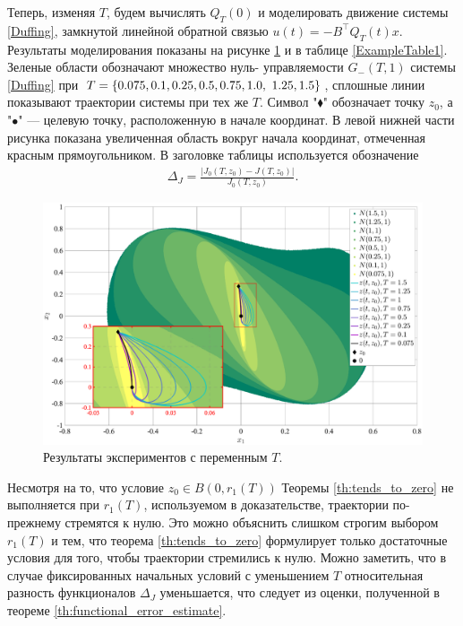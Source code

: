 \documentclass[../main.tex]{subfiles}
\begin{document}
Теперь, изменяя $T$, будем вычислять $Q_T(0)$ и моделировать движение системы \eqref{Duffing}, замкнутой линейной обратной связью $u(t) = -B^{\top}Q_T(t)x$.
Результаты моделирования показаны на рисунке \ref{fig:series1} и в таблице 
\ref{ExampleTable1}.
Зеленые области обозначают множество нуль- управляемости 
$G_{-}(T,1)$ системы \eqref{Duffing} при $T = \{0.075, 0.1, 0.25, 0.5, 0.75, 1.0,\\\ 1.25, 1.5\}$, сплошные линии показывают траектории системы при тех же $T$. 
Символ "$\blacklozenge$" обозначает точку $z_0$, а "$\bullet$" --- целевую точку, расположенную в начале координат.  
В левой нижней части рисунка показана увеличенная область вокруг начала координат, отмеченная красным прямоугольником.
В заголовке таблицы используется обозначение  
\begin{gather*}
    \Delta_J = \frac{| J_0(T,z_0) - J(T,z_0) |}{J_0(T,z_0)}.
\end{gather*}


\begin{figure}
    \centering
    \includegraphics[width=\linewidth]{images/GusevMIOsipov_Duffing_fixed_z0.eps}
    \caption{Результаты экспериментов с переменным $T$.}
    \label{fig:series1}
\end{figure}

Несмотря на то, что условие $z_0 \in B(0,r_1(T))$ Теоремы \ref{th:tends_to_zero} не выполняется при $r_1(T)$, используемом в доказательстве, траектории по-прежнему стремятся к нулю. 
Это можно объяснить слишком строгим выбором $r_1(T)$ и тем, что теорема \ref{th:tends_to_zero} формулирует только достаточные условия для того, чтобы траектории стремились к нулю. 
Можно заметить, что в случае фиксированных начальных условий с уменьшением $T$ относительная разность функционалов $\Delta_J$ уменьшается, что следует из оценки, полученной в теореме \ref{th:functional_error_estimate}.
\end{document}
